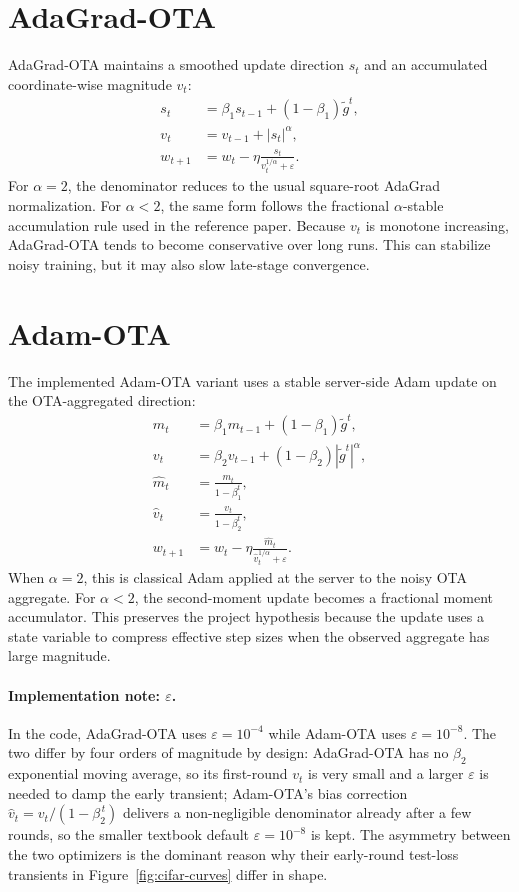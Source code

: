 \section{AdaGrad-OTA}
AdaGrad-OTA maintains a smoothed update direction $s_t$ and an accumulated
coordinate-wise magnitude $v_t$:
\begin{align}
    s_t &= \beta_1 s_{t-1} + (1-\beta_1)\tilde{g}^t, \\
    v_t &= v_{t-1} + |s_t|^{\alpha}, \\
    w_{t+1} &= w_t -
    \eta \frac{s_t}{v_t^{1/\alpha}+\varepsilon}.
\end{align}
For $\alpha=2$, the denominator reduces to the usual square-root AdaGrad
normalization. For $\alpha<2$, the same form follows the fractional
$\alpha$-stable accumulation rule used in the reference paper. Because $v_t$ is
monotone increasing, AdaGrad-OTA tends to become conservative over long runs.
This can stabilize noisy training, but it may also slow late-stage
convergence.

\section{Adam-OTA}
The implemented Adam-OTA variant uses a stable server-side Adam update on the
OTA-aggregated direction:
\begin{align}
    m_t &= \beta_1 m_{t-1} + (1-\beta_1)\tilde{g}^t, \\
    v_t &= \beta_2 v_{t-1} + (1-\beta_2)|\tilde{g}^t|^{\alpha}, \\
    \hat{m}_t &= \frac{m_t}{1-\beta_1^t}, \\
    \hat{v}_t &= \frac{v_t}{1-\beta_2^t}, \\
    w_{t+1} &= w_t -
    \eta \frac{\hat{m}_t}{\hat{v}_t^{1/\alpha}+\varepsilon}.
\end{align}
When $\alpha=2$, this is classical Adam applied at the server to the
noisy OTA aggregate. For $\alpha<2$, the second-moment update becomes a
fractional moment accumulator. This preserves the project hypothesis
because the update uses a state variable to compress effective step
sizes when the observed aggregate has large magnitude.

\paragraph{Implementation note: $\varepsilon$.}
In the code, AdaGrad-OTA uses $\varepsilon=10^{-4}$ while Adam-OTA uses
$\varepsilon=10^{-8}$. The two differ by four orders of magnitude by
design: AdaGrad-OTA has no $\beta_2$ exponential moving average, so its
first-round $v_t$ is very small and a larger $\varepsilon$ is needed to
damp the early transient; Adam-OTA's bias correction
$\hat v_t = v_t/(1-\beta_2^{\,t})$ delivers a non-negligible denominator
already after a few rounds, so the smaller textbook default
$\varepsilon=10^{-8}$ is kept. The asymmetry between the two optimizers
is the dominant reason why their early-round test-loss transients in
Figure~\ref{fig:cifar-curves} differ in shape.

